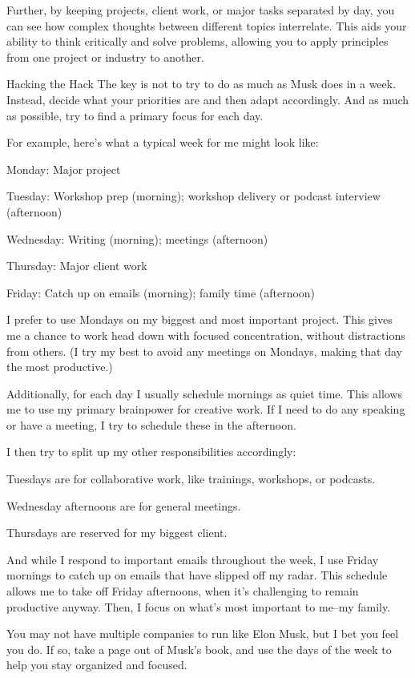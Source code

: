 Further, by keeping projects, client work, or major tasks separated by day, you can see how complex thoughts between different topics interrelate. This aids your ability to think critically and solve problems, allowing you to apply principles from one project or industry to another. 

Hacking the Hack
The key is not to try to do as much as Musk does in a week. Instead, decide what your priorities are and then adapt accordingly. And as much as possible, try to find a primary focus for each day.

For example, here's what a typical week for me might look like:

Monday: Major project 

Tuesday: Workshop prep (morning); workshop delivery or podcast interview (afternoon)

Wednesday: Writing (morning); meetings (afternoon)

Thursday: Major client work 

Friday: Catch up on emails (morning); family time (afternoon)

I prefer to use Mondays on my biggest and most important project. This gives me a chance to work head down with focused concentration, without distractions from others. (I try my best to avoid any meetings on Mondays, making that day the most productive.)

Additionally, for each day I usually schedule mornings as quiet time. This allows me to use my primary brainpower for creative work. If I need to do any speaking or have a meeting, I try to schedule these in the afternoon.

I then try to split up my other responsibilities accordingly:

Tuesdays are for collaborative work, like trainings, workshops, or podcasts.

Wednesday afternoons are for general meetings.

Thursdays are reserved for my biggest client.

And while I respond to important emails throughout the week, I use Friday mornings to catch up on emails that have slipped off my radar. This schedule allows me to take off Friday afternoons, when it's challenging to remain productive anyway. Then, I focus on what's most important to me--my family. 

You may not have multiple companies to run like Elon Musk, but I bet you feel you do. If so, take a page out of Musk's book, and use the days of the week to help you stay organized and focused.

